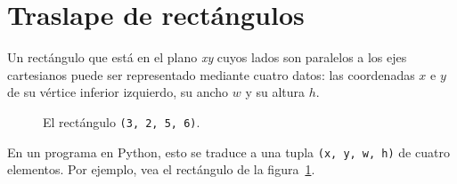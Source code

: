 \section{Traslape de rectángulos}

Un rectángulo que está en el plano \emph{xy} cuyos lados son paralelos a
los ejes cartesianos puede ser representado mediante cuatro datos:
las coordenadas \(x\) e \(y\) de su vértice inferior izquierdo,
su ancho \(w\) y su altura \(h\).

\begin{figure}
  \centering
  
  \label{fig:rect1}
  \caption{El rectángulo \lstinline!(3, 2, 5, 6)!.}
\end{figure}

En un programa en Python, esto se traduce a una tupla
\lstinline!(x, y, w, h)! de cuatro elementos.
Por ejemplo, vea el rectángulo de la figura~\ref{fig:rect1}.

